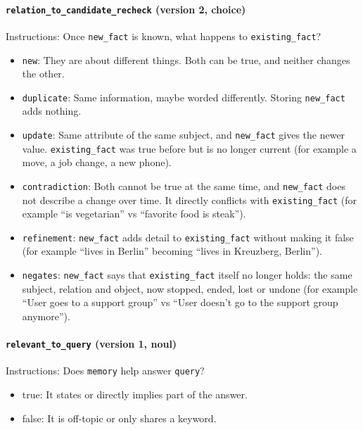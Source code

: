 \documentclass[11pt]{article}
\begin{document}
\paragraph{\texttt{relation\_\allowbreak{}to\_\allowbreak{}candidate\_\allowbreak{}recheck} (version 2, choice)}
Instructions: Once \texttt{new\_\allowbreak{}fact} is known, what happens to \texttt{existing\_\allowbreak{}fact}?

\begin{itemize}
\item \texttt{new}: They are about different things. Both can be true, and neither changes the other.
\item \texttt{duplicate}: Same information, maybe worded differently. Storing \texttt{new\_\allowbreak{}fact} adds nothing.
\item \texttt{update}: Same attribute of the same subject, and \texttt{new\_\allowbreak{}fact} gives the newer value. \texttt{existing\_\allowbreak{}fact} was true before but is no longer current (for example a move, a job change, a new phone).
\item \texttt{contradiction}: Both cannot be true at the same time, and \texttt{new\_\allowbreak{}fact} does not describe a change over time. It directly conflicts with \texttt{existing\_\allowbreak{}fact} (for example ``is vegetarian'' vs ``favorite food is steak'').
\item \texttt{refinement}: \texttt{new\_\allowbreak{}fact} adds detail to \texttt{existing\_\allowbreak{}fact} without making it false (for example ``lives in Berlin'' becoming ``lives in Kreuzberg, Berlin'').
\item \texttt{negates}: \texttt{new\_\allowbreak{}fact} says that \texttt{existing\_\allowbreak{}fact} itself no longer holds: the same subject, relation and object, now stopped, ended, lost or undone (for example ``User goes to a support group'' vs ``User doesn't go to the support group anymore'').
\end{itemize}
\paragraph{\texttt{relevant\_\allowbreak{}to\_\allowbreak{}query} (version 1, noul)}
Instructions: Does \texttt{memory} help answer \texttt{query}?

\begin{itemize}
\item true: It states or directly implies part of the answer.
\item false: It is off-topic or only shares a keyword.
\end{itemize}
\end{document}
